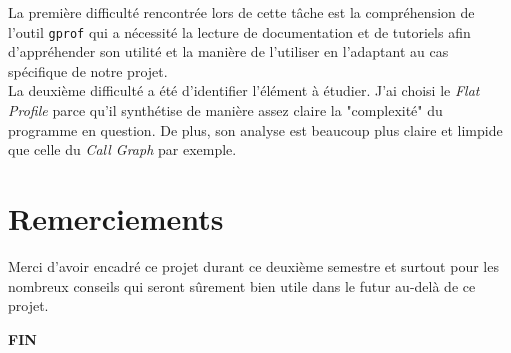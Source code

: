 \documentclass[a4paper, 12pt]{article}
\begin{document}
La première difficulté rencontrée lors de cette tâche est la compréhension de l'outil \verb|gprof| qui a nécessité la lecture de documentation et de tutoriels afin d'appréhender son utilité et la manière de l'utiliser en l'adaptant au cas spécifique de notre projet.\\

La deuxième difficulté a été d'identifier l'élément à étudier. J'ai choisi le \emph{Flat Profile} parce qu'il synthétise de manière assez claire la "complexité" du programme en question. De plus, son analyse est beaucoup plus claire et limpide que celle du \emph{Call Graph} par exemple.

\section{Remerciements}

Merci d'avoir encadré ce projet durant ce deuxième semestre et surtout pour les nombreux conseils qui seront sûrement bien utile dans le futur au-delà de ce projet.

\vspace{110pt}

\begin{center}
    \textbf{\LARGE{FIN}}
\end{center}
\end{document}
